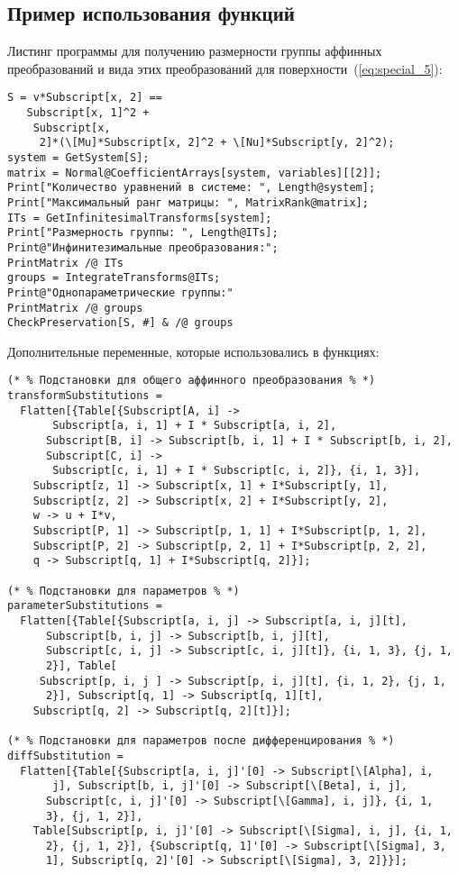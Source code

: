 \documentclass[../main.tex]{subfiles}
\begin{document}
\subsection{Пример использования функций}
Листинг программы для получению размерности группы аффинных преобразований и вида этих преобразований для поверхности~(\ref{eq:special_5}):
\begin{lstlisting}
S = v*Subscript[x, 2] == 
   Subscript[x, 1]^2 + 
    Subscript[x, 
     2]*(\[Mu]*Subscript[x, 2]^2 + \[Nu]*Subscript[y, 2]^2);
system = GetSystem[S];
matrix = Normal@CoefficientArrays[system, variables][[2]];
Print["Количество уравнений в системе: ", Length@system];
Print["Максимальный ранг матрицы: ", MatrixRank@matrix];
ITs = GetInfinitesimalTransforms[system];
Print["Размерность группы: ", Length@ITs];
Print@"Инфинитезимальные преобразования:";
PrintMatrix /@ ITs
groups = IntegrateTransforms@ITs;
Print@"Однопараметрические группы:"
PrintMatrix /@ groups
CheckPreservation[S, #] & /@ groups
\end{lstlisting}
Дополнительные переменные, которые использовались в функциях:
\begin{lstlisting}
(* % Подстановки для общего аффинного преобразования % *)
transformSubstitutions = 
  Flatten[{Table[{Subscript[A, i] -> 
       Subscript[a, i, 1] + I * Subscript[a, i, 2], 
      Subscript[B, i] -> Subscript[b, i, 1] + I * Subscript[b, i, 2], 
      Subscript[C, i] -> 
       Subscript[c, i, 1] + I * Subscript[c, i, 2]}, {i, 1, 3}], 
    Subscript[z, 1] -> Subscript[x, 1] + I*Subscript[y, 1], 
    Subscript[z, 2] -> Subscript[x, 2] + I*Subscript[y, 2], 
    w -> u + I*v, 
    Subscript[P, 1] -> Subscript[p, 1, 1] + I*Subscript[p, 1, 2], 
    Subscript[P, 2] -> Subscript[p, 2, 1] + I*Subscript[p, 2, 2], 
    q -> Subscript[q, 1] + I*Subscript[q, 2]}];
    
(* % Подстановки для параметров % *)
parameterSubstitutions = 
  Flatten[{Table[{Subscript[a, i, j] -> Subscript[a, i, j][t], 
      Subscript[b, i, j] -> Subscript[b, i, j][t], 
      Subscript[c, i, j] -> Subscript[c, i, j][t]}, {i, 1, 3}, {j, 1, 
      2}], Table[
     Subscript[p, i, j ] -> Subscript[p, i, j][t], {i, 1, 2}, {j, 1, 
      2}], Subscript[q, 1] -> Subscript[q, 1][t], 
    Subscript[q, 2] -> Subscript[q, 2][t]}]; 
    
(* % Подстановки для параметров после дифференцирования % *)
diffSubstitution = 
  Flatten[{Table[{Subscript[a, i, j]'[0] -> Subscript[\[Alpha], i, 
       j], Subscript[b, i, j]'[0] -> Subscript[\[Beta], i, j], 
      Subscript[c, i, j]'[0] -> Subscript[\[Gamma], i, j]}, {i, 1, 
      3}, {j, 1, 2}], 
    Table[Subscript[p, i, j]'[0] -> Subscript[\[Sigma], i, j], {i, 1, 
      2}, {j, 1, 2}], {Subscript[q, 1]'[0] -> Subscript[\[Sigma], 3, 
      1], Subscript[q, 2]'[0] -> Subscript[\[Sigma], 3, 2]}}];
\end{lstlisting}
\end{document}
